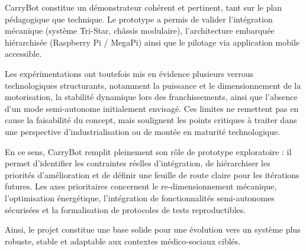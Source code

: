\documentclass[12pt,a4paper]{article}
\begin{document}
CarryBot constitue un démonstrateur cohérent et pertinent, tant sur le plan pédagogique que technique. Le prototype a permis de valider l’intégration mécanique (système Tri-Star, châssis modulaire), l’architecture embarquée hiérarchisée (Raspberry Pi / MegaPi) ainsi que le pilotage via application mobile accessible.  

Les expérimentations ont toutefois mis en évidence plusieurs verrous technologiques structurants, notamment la puissance et le dimensionnement de la motorisation, la stabilité dynamique lors des franchissements, ainsi que l’absence d’un mode semi-autonome initialement envisagé. Ces limites ne remettent pas en cause la faisabilité du concept, mais soulignent les points critiques à traiter dans une perspective d’industrialisation ou de montée en maturité technologique.

En ce sens, CarryBot remplit pleinement son rôle de prototype exploratoire : il permet d’identifier les contraintes réelles d’intégration, de hiérarchiser les priorités d’amélioration et de définir une feuille de route claire pour les itérations futures. Les axes prioritaires concernent le re-dimensionnement mécanique, l’optimisation énergétique, l’intégration de fonctionnalités semi-autonomes sécurisées et la formalisation de protocoles de tests reproductibles.

Ainsi, le projet constitue une base solide pour une évolution vers un système plus robuste, stable et adaptable aux contextes médico-sociaux ciblés.

\newpage
\end{document}
